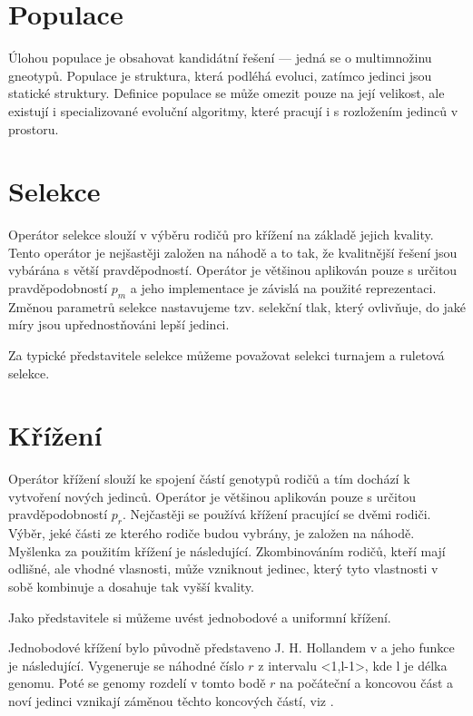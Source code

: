 \section{Populace}
Úlohou populace je obsahovat kandidátní řešení --- jedná se o multimnožinu gneotypů.
Populace je struktura, která podléhá evoluci, zatímco jedinci jsou statické struktury.
Definice populace se může omezit pouze na její velikost, ale existují i specializované evoluční algoritmy, které pracují i s rozložením jedinců v prostoru.


\section{Selekce}
Operátor selekce slouží v výběru rodičů pro křížení na základě jejich kvality.
Tento operátor je nejšastěji založen na náhodě a to tak, že kvalitnější řešení jsou vybárána s větší pravděpodností.
Operátor je většinou aplikován pouze s určitou pravděpodobností $p_m$ a jeho implementace je závislá na použité reprezentaci.
Změnou parametrů selekce nastavujeme tzv. selekční tlak, který ovlivňuje, do jaké míry jsou upřednostňováni lepší jedinci.

Za typické představitele selekce můžeme považovat selekci turnajem a ruletová selekce.

\section{Křížení}
Operátor křížení slouží ke spojení částí genotypů rodičů a tím dochází k vytvoření nových jedinců.
Operátor je většinou aplikován pouze s určitou pravděpodobností $p_r$.
Nejčastěji se používá křížení pracující se dvěmi rodiči.
Výběr, jeké části ze kterého rodiče budou vybrány, je založen na náhodě.
Myšlenka za použitím křížení je následující.
Zkombinováním rodičů, kteří mají odlišné, ale vhodné vlasnosti, může vzniknout jedinec, který tyto vlastnosti v sobě kombinuje a dosahuje tak vyšší kvality.

Jako představitele si můžeme uvést jednobodové a uniformní křížení.

Jednobodové křížení bylo původně představeno J. H. Hollandem v  a jeho funkce je následující.
Vygeneruje se náhodné číslo $r$ z intervalu  <1,l-1>, kde l je délka genomu.
Poté se genomy rozdelí v tomto bodě $r$ na počáteční a koncovou část a noví jedinci vznikají záměnou těchto koncových částí, viz .

